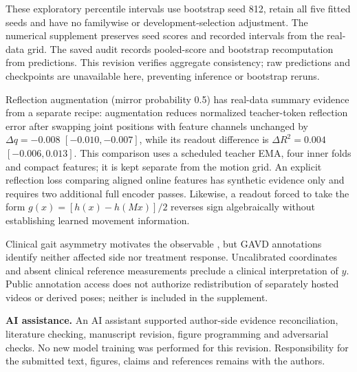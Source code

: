 \documentclass{article}
\begin{document}
These exploratory percentile intervals use bootstrap seed 812, retain
all five fitted seeds and have no familywise or development-selection
adjustment. The numerical supplement preserves seed scores and recorded
intervals from the real-data grid. The saved audit records pooled-score
and bootstrap recomputation from predictions. This revision verifies
aggregate consistency; raw predictions and checkpoints are unavailable
here, preventing inference or bootstrap reruns.

Reflection augmentation (mirror probability 0.5) has real-data summary
evidence from a separate recipe: augmentation reduces normalized
teacher-token reflection error after swapping joint positions with
feature channels unchanged by \(\Delta q=-0.008\) \([-0.010,-0.007]\),
while its readout difference is \(\Delta R^2=0.004\) \([-0.006,0.013]\).
This comparison uses a scheduled teacher EMA, four inner folds and
compact features; it is kept separate from the motion grid. An explicit
reflection loss comparing aligned online features has synthetic evidence
only and requires two additional full encoder passes. Likewise, a
readout forced to take the form \(g(x)=[h(x)-h(Mx)]/2\) reverses sign
algebraically without establishing learned movement information.

Clinical gait asymmetry motivates the observable \citep{stroke}, but
GAVD annotations identify neither affected side nor treatment response.
Uncalibrated coordinates and absent clinical reference measurements
preclude a clinical interpretation of \(y\). Public annotation access
does not authorize redistribution of separately hosted videos or derived
poses; neither is included in the supplement.

\textbf{AI assistance.} An AI assistant supported author-side evidence
reconciliation, literature checking, manuscript revision, figure
programming and adversarial checks. No new model training was performed
for this revision. Responsibility for the submitted text, figures,
claims and references remains with the authors.
\end{document}
